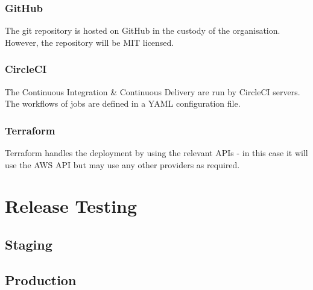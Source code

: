 \documentclass[10pt]{article}
\begin{document}
\subsubsection{GitHub}
The git repository is hosted on GitHub in the custody of the organisation. However, the repository will be MIT licensed.
\subsubsection{CircleCI}
The Continuous Integration \& Continuous Delivery are run by CircleCI servers. The workflows of jobs are defined in a YAML configuration file. 
\subsubsection{Terraform}
Terraform handles the deployment by using the relevant APIs - in this case it will use the AWS API but may use any other providers as required.


\section{Release Testing}
\subsection{Staging}
\subsection{Production}


\newpage
\printbibliography
\end{document}
